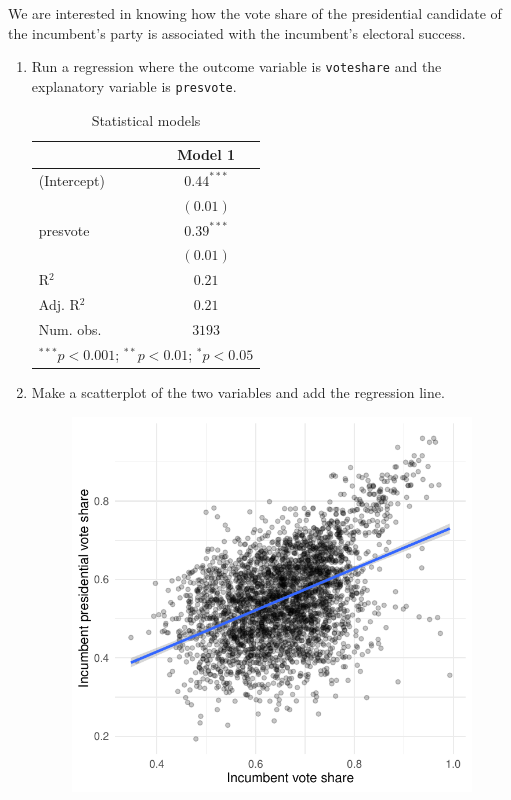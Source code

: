 \documentclass[12pt,letterpaper]{article}
\begin{document}
\noindent We are interested in knowing how the vote share of the presidential candidate of the incumbent's party is associated with the incumbent's electoral success.
	\vspace{.25cm}
	\begin{enumerate}
		\item Run a regression where the outcome variable is \texttt{voteshare} and the explanatory variable is \texttt{presvote}.
				 
				\begin{table}[H]
\begin{center}
\begin{tabular}{l c}
\hline
 & Model 1 \\
\hline
(Intercept) & $0.44^{***}$ \\
            & $(0.01)$     \\
presvote    & $0.39^{***}$ \\
            & $(0.01)$     \\
\hline
R$^2$       & $0.21$       \\
Adj. R$^2$  & $0.21$       \\
Num. obs.   & $3193$       \\
\hline
\multicolumn{2}{l}{\scriptsize{$^{***}p<0.001$; $^{**}p<0.01$; $^{*}p<0.05$}}
\end{tabular}
\caption{Statistical models}
\label{table:coefficients}
\end{center}
\end{table}
				
		\item Make a scatterplot of the two variables and add the regression line. 
				 \vspace{7cm}
				
				\begin{figure}[h!]  
    \centering
    \includegraphics{Question3plot.pdf}  
\end{figure}


\end{enumerate}
\end{document}
